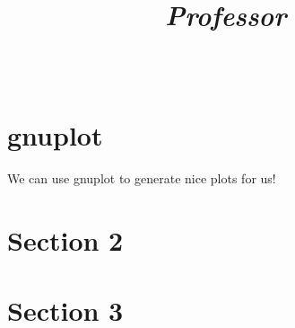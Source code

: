 \documentclass[titlepage]{article}
\title{
  \textmd{\LARGE{\textbf{\noteTitle}}}\\
  \vspace{5pt}
  \textmd{\Large{\textit{\class}}}\\
  \textmd{\Large{\textit{Professor\ \professor}}}\\
  \vspace{3.5in}
  \textmd{\LARGE{\textbf{\notesAuthor}}}\\
  \date{}
  \author{}
}
\begin{document}
\maketitle

\section*{gnuplot}
We can use gnuplot to generate nice plots for us!

\section*{Section 2}

\section*{Section 3}
\end{document}
